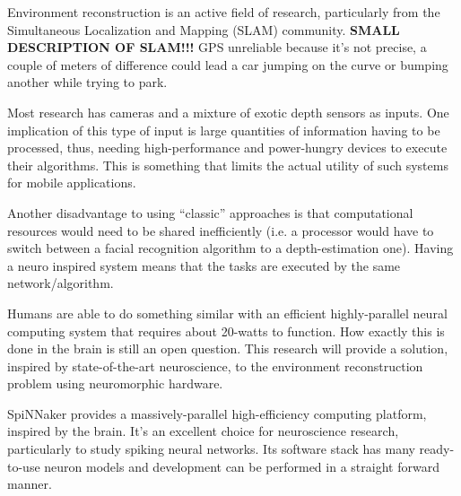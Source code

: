 Environment reconstruction is an active field of research, particularly from the Simultaneous Localization and Mapping (SLAM) community\cite{Thrun2008_SLAM}. \textbf{SMALL DESCRIPTION OF SLAM!!!} GPS unreliable because it's not precise, a couple of meters of difference could lead a car jumping on the curve or bumping another while trying to park.

Most research has cameras and a mixture of exotic depth sensors as inputs. One implication of this type of input is large quantities of information having to be processed, thus, needing high-performance and power-hungry devices to execute their algorithms. This is something that limits the actual utility of such systems for mobile applications.

Another disadvantage to using ``classic'' approaches is that computational resources would need to be shared inefficiently (i.e. a processor would have to switch between a facial recognition algorithm to a depth-estimation one). Having a neuro inspired system means that the tasks are executed by the same network/algorithm.

Humans are able to do something similar with an efficient highly-parallel neural computing system that requires about 20-watts to function. How exactly this is done in the brain is still an open question. This research will provide a solution, inspired by state-of-the-art neuroscience, to the environment reconstruction problem using neuromorphic hardware.

SpiNNaker provides a massively-parallel high-efficiency computing platform, inspired by the brain. It's an excellent choice for neuroscience research, particularly to study spiking neural networks. Its software stack has many ready-to-use neuron models and development can be performed in a straight forward manner. 


